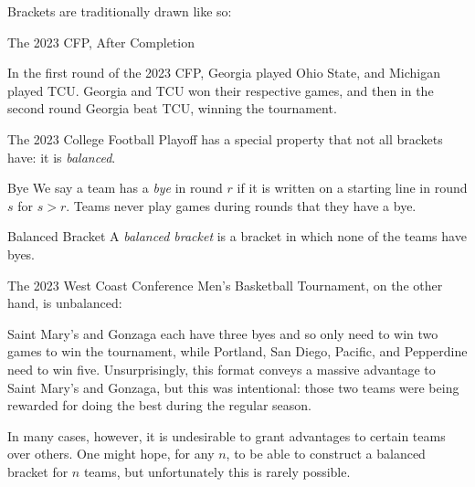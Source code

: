 {Brackets are traditionally drawn like so:


 {The 2023 CFP, After Completion}{}

In the first round of the 2023 CFP, Georgia played Ohio State, and Michigan played TCU. Georgia and TCU won their respective games, and then in the second round Georgia beat TCU, winning the tournament.

The 2023 College Football Playoff has a special property that not all brackets have: it is \textit{balanced}.

\begin{definition}{Bye}{}
    We say a team has a \textit{bye} in round $r$ if it is written on a starting line in round $s$ for $s > r.$ Teams never play games during rounds that they have a bye.
\end{definition}

\begin{definition}{Balanced Bracket}{}
    A \textit{balanced bracket} is a bracket in which none of the teams have byes.
\end{definition} 

The 2023 West Coast Conference Men's Basketball Tournament, on the other hand, is unbalanced:

Saint Mary's and Gonzaga each have three byes and so only need to win two games to win the tournament, while Portland, San Diego, Pacific, and Pepperdine need to win five. Unsurprisingly, this format conveys a massive advantage to Saint Mary's and Gonzaga, but this was intentional: those two teams were being rewarded for doing the best during the regular season.

In many cases, however, it is undesirable to grant advantages to certain teams over others. One might hope, for any $n$, to be able to construct a balanced bracket for $n$ teams, but unfortunately this is rarely possible.



}
